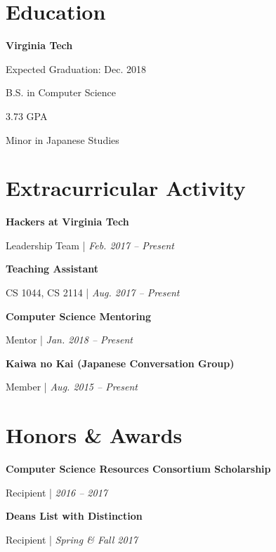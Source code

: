 \documentclass[9pt]{extarticle}
\newcommand{\Subsection}[2]{
    {\normalsize\bfseries\color{subsection}#1}
    \begin{trivlist}
        \color{bullet}
        #2
    \end{trivlist}
}
\newcommand{\ChronoItem}[2]{
    \item {\color{bullet}#1 | {\footnotesize\textit{#2}}}
}
\begin{document}
\begin{paracol}{2}
\begin{rightcolumn}
        \section{Education}
            \Subsection{Virginia Tech}{
                \item Expected Graduation: Dec. 2018
                \item B.S. in Computer Science
                \item 3.73 GPA
                \item Minor in Japanese Studies
            }
        \vfill
        \section{Extracurricular Activity}
            \Subsection{Hackers at Virginia Tech}{
                \ChronoItem{Leadership Team}{Feb. 2017 -- Present}
            }
            \vfill
            \Subsection{Teaching Assistant}{
                \ChronoItem{CS 1044, CS 2114}{Aug. 2017 -- Present}
            }
            \vfill
            \Subsection{Computer Science Mentoring}{
                \ChronoItem{Mentor}{Jan. 2018 -- Present}
            }
            \vfill
            \Subsection{Kaiwa no Kai (Japanese Conversation Group)}{
                \ChronoItem{Member}{Aug. 2015 -- Present}
            }
        \vfill
        \section{Honors \& Awards}
            \Subsection{Computer Science Resources Consortium Scholarship}{
                \ChronoItem{Recipient}{2016 -- 2017}
            }
            \vfill
            \Subsection{Deans List with Distinction}{
                \ChronoItem{Recipient}{Spring \& Fall 2017}
            }
        \pagebreak
    \end{rightcolumn}
\end{paracol}
\end{document}
